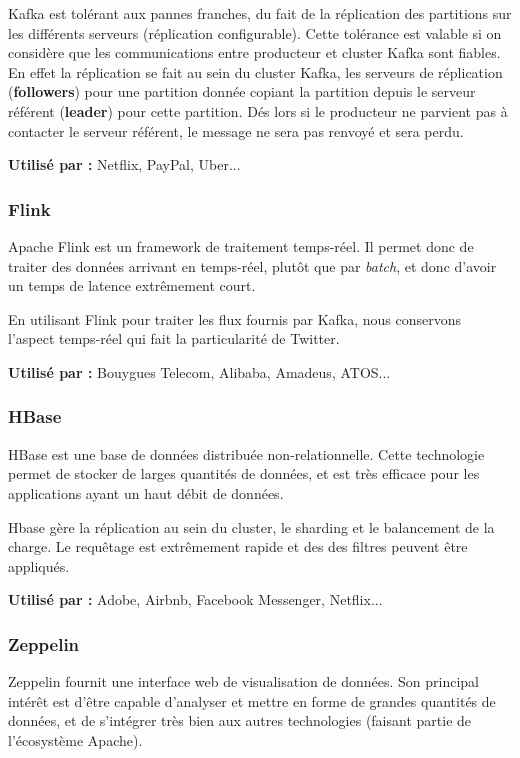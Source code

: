 \documentclass[a4paper,oneside,10pt]{article}
\begin{document}
Kafka est tolérant aux pannes franches, du fait de la réplication des partitions sur les différents serveurs (réplication configurable). Cette tolérance est valable si on considère que les communications entre producteur et cluster Kafka sont fiables. En effet la réplication se fait au sein du cluster Kafka, les serveurs de réplication (\textbf{followers}) pour une partition donnée copiant la partition depuis le serveur référent (\textbf{leader}) pour cette partition. Dés lors si le producteur ne parvient pas à contacter le serveur référent, le message ne sera pas renvoyé et sera perdu. 

\textbf{Utilisé par :} Netflix, PayPal, Uber...


\subsubsection{Flink}
Apache Flink est un framework de traitement temps-réel. Il permet donc de traiter des données arrivant en temps-réel, plutôt que par \textit{batch}, et donc d'avoir un temps de latence extr\^emement court.

En utilisant Flink pour traiter les flux fournis par Kafka, nous conservons l'aspect temps-réel qui fait la particularité de Twitter.

\textbf{Utilisé par :} Bouygues Telecom, Alibaba, Amadeus, ATOS...


\subsubsection{HBase}
HBase est une base de données distribuée non-relationnelle. Cette technologie permet de stocker de larges quantités de données, et est très efficace pour les applications ayant un haut débit de données.

Hbase gère la réplication au sein du cluster, le sharding et le balancement de la charge. Le requêtage est extrêmement rapide et des des filtres peuvent être appliqués.

\textbf{Utilisé par :} Adobe, Airbnb, Facebook Messenger, Netflix...


\subsubsection{Zeppelin}
Zeppelin fournit une interface web de visualisation de données. Son principal intérêt est d'être capable d'analyser et mettre en forme de grandes quantités de données, et de s'intégrer très bien aux autres technologies (faisant partie de l'écosystème Apache).
\end{document}
